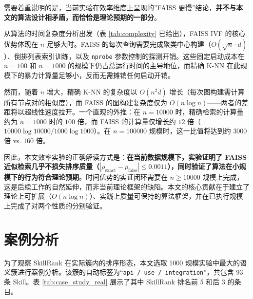 需要着重说明的是，当前实验在效率维度上呈现的”FAISS 更慢”结论，\textbf{并不与本文的算法设计相矛盾，而恰恰是理论预期的一部分}。

从算法的时间复杂度分析出发（表 \ref{tab:complexity} 已给出），FAISS IVF 的核心优势体现在 $n$ 足够大时。FAISS 的每次查询需要完成聚类中心构建（$O(\sqrt{n} \cdot d)$）、倒排列表索引训练，以及 \texttt{nprobe} 参数控制的探测开销。这些固定启动成本在 $n=100$ 和 $n=1000$ 的规模下仍占总运行时间的主导地位，而精确 K-NN 在此规模下的暴力计算量足够小，反而无需摊销任何启动开销。

然而，随着 $n$ 增大，精确 K-NN 的复杂度以 $O(n^2 d)$ 增长（每次图构建需计算所有节点对的相似度），而 FAISS 的图构建复杂度仅为 $O(n \log n)$——两者的差距将以超线性速度拉开。一个直观的外推：在 $n = 10000$ 时，精确检索的计算量约为 $n=1000$ 时的 $100$ 倍，而 FAISS 的计算量仅增长约 $12$ 倍（$10000 \log 10000 / 1000 \log 1000$）。在 $n = 100000$ 规模时，这一比值将达到约 $3000$ 倍 vs. $160$ 倍。

因此，本文效率实验的正确解读方式是：\textbf{在当前数据规模下，实验证明了 FAISS 近似检索几乎不损失排序质量（$|\rho_{\text{exact}} - \rho_{\text{faiss}}| \leq 0.0011$），同时验证了算法在小规模下的行为符合理论预期}。时间优势的实证闭环需要在 $n \geq 10000$ 规模上完成，这是后续工作的自然延伸，而非当前理论框架的缺陷。本文的核心贡献在于建立了理论上可扩展（$O(n \log n)$）、实践上质量可保持的算法框架，并在已执行规模上完成了对两个性质的分别验证。

\section{案例分析}
\label{sec:case_study}

为了观察 SkillRank 在实际簇内的排序形态，本文选取 1000 规模实验中最大的语义簇进行案例分析。该簇的自动标签为“\texttt{api / use / integration}”，共包含 93 条 Skill。表 \ref{tab:case_study_real} 展示了其中 SkillRank 排名前 5 和后 3 的条目。

